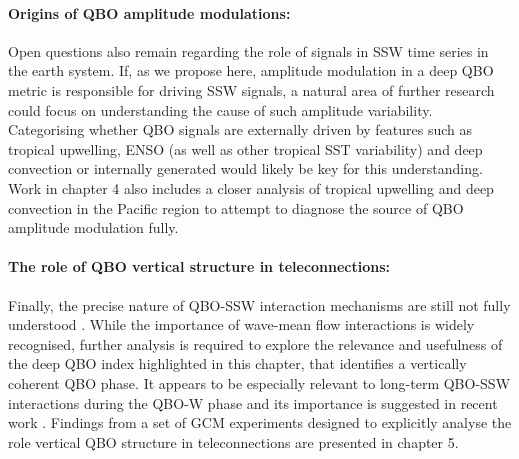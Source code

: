 \paragraph{Origins of QBO amplitude modulations:} Open questions also remain regarding the role of signals in SSW time series in the earth system. If, as we propose here, amplitude modulation in a deep QBO metric is responsible for driving SSW signals, a natural area of further research could focus on understanding the cause of such amplitude variability. Categorising whether QBO signals are externally driven by features such as tropical upwelling, ENSO (as well as other tropical SST variability) and deep convection or internally generated would likely be key for this understanding. Work in chapter 4 also includes a closer analysis of tropical upwelling and deep convection in the Pacific region to attempt to diagnose the source of QBO amplitude modulation fully.

\paragraph{The role of QBO vertical structure in teleconnections:} Finally, the precise nature of QBO-SSW interaction mechanisms are still not fully understood \citep{ansteyHighlatitude2014}. While the importance of wave-mean flow interactions is widely recognised, further analysis is required to explore the relevance and usefulness of the deep QBO index highlighted in this chapter, that identifies a vertically coherent QBO phase. It appears to be especially relevant to long-term QBO-SSW interactions during the QBO-W phase and its importance is suggested in recent work \citep{andrewsObserved2019}. Findings from a set of GCM experiments designed to explicitly analyse the role vertical QBO structure in teleconnections are presented in chapter 5. 
